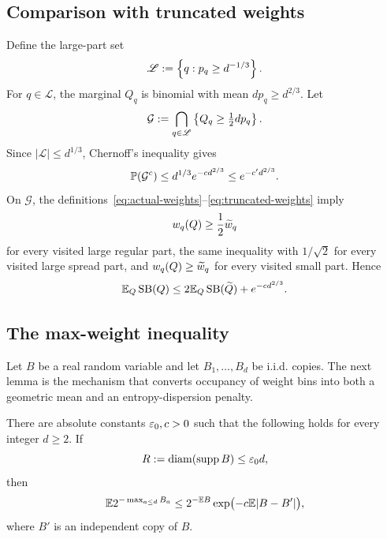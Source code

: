 \subsection{Comparison with truncated weights}

Define the large-part set
\[
  \mathscr L:=\left\{q:p_q\ge d^{-1/3}\right\}.
\]
For $q\in\mathscr L$, the marginal $Q_q$ is binomial with mean $dp_q\ge d^{2/3}$. Let
\[
  \mathcal G:=\bigcap_{q\in\mathscr L}\left\{Q_q\ge\tfrac12dp_q\right\}.
\]
Since $|\mathscr L|\le d^{1/3}$, Chernoff's inequality gives
\begin{equation}\label{eq:profile-good-failure}
  \mathbb P(\mathcal G^c)
  \le d^{1/3}e^{-cd^{2/3}}
  \le e^{-c'd^{2/3}}.
\end{equation}
On $\mathcal G$, the definitions~\eqref{eq:actual-weights}--\eqref{eq:truncated-weights} imply
\[
  w_q(Q)\ge\frac12\widetilde w_q
\]
for every visited large regular part, the same inequality with $1/\sqrt2$ for every visited large spread part, and $w_q(Q)\ge\widetilde w_q$ for every visited small part. Hence
\begin{equation}\label{eq:actual-truncated-comparison}
  \mathbb E_Q\operatorname{SB}(Q)
  \le2\mathbb E_Q\operatorname{SB}(\widetilde Q)+e^{-cd^{2/3}}.
\end{equation}

\subsection{The max-weight inequality}

Let $B$ be a real random variable and let $B_1,\ldots,B_d$ be i.i.d. copies. The next lemma is the mechanism that converts occupancy of weight bins into both a geometric mean and an entropy-dispersion penalty.

\begin{lemma}\label{lem:max-weight}
There are absolute constants $\varepsilon_0,c>0$ such that the following holds for every integer $d\ge2$. If
\[
  R:=\operatorname{diam}(\operatorname{supp} B)\le\varepsilon_0d,
\]
then
\begin{equation}\label{eq:max-weight}
  \mathbb E2^{-\max_{a\le d}B_a}
  \le2^{-\mathbb E B}\exp\bigl(-c\mathbb E|B-B'|\bigr),
\end{equation}
where $B'$ is an independent copy of $B$.
\end{lemma}

